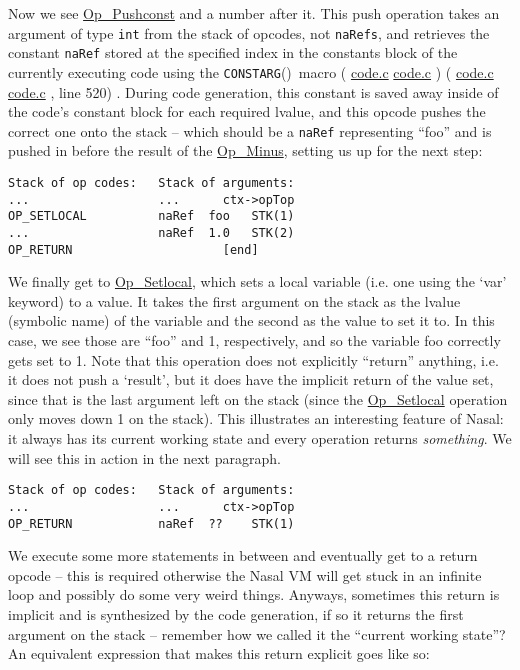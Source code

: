 \documentclass{article}
\newcommand{\type}[1]{\textcolor{type}{\tt #1}}
\newcommand{\localmacro}[1]{\textcolor{func}{\tt #1}}
\newcommand{\nasalsourcefile}[2][]{%
  \ifthenelse{\isempty{#1}}%
    {%
      \textcolor{source}{%
        \href{https://github.com/andyross/nasal/blob/master/src/#2}{#2}%
      }%
    }%
    {%
      \textcolor{source}{%
        \href{https://github.com/andyross/nasal/blob/master/src/#2\#L#1}{#2}%
      }%
    }%
}
\newcommand{\citesourcefile}[2][]{%
  \ifthenelse{\isempty{#1}}%
    {%
      (\nasalsourcefile{#2})%
    }%
    {%
      (\nasalsourcefile[#1]{#2}, line #1)%
    }%
}
\newcommand{\Op} [1]{\hyperref[op:#1]{\textcolor{opcode}{\sc Op\_#1}}}
\newcommand{\fp}{\textcolor{func}{()}}
\begin{document}
Now we see \Op{Pushconst} and a number after it.  This push operation takes an argument of type \type{int} from the stack of opcodes, not \type{naRefs}, and retrieves the constant \type{naRef} stored at the specified index in the constants block of the currently executing code using the \localmacro{CONSTARG}\fp\ macro \citesourcefile[520]{code.c}.  During code generation, this constant is saved away inside of the code's constant block for each required lvalue, and this opcode pushes the correct one onto the stack -- which should be a \type{naRef} representing ``foo'' and is pushed in before the result of the \Op{Minus}, setting us up for the next step:

\begin{verbatim}
Stack of op codes:   Stack of arguments:
...                  ...      ctx->opTop
OP_SETLOCAL          naRef  foo   STK(1)
...                  naRef  1.0   STK(2)
OP_RETURN                     [end]
\end{verbatim}

We finally get to \Op{Setlocal}, which sets a local variable (i.e. one using the `var' keyword) to a value.  It takes the first argument on the stack as the lvalue (symbolic name) of the variable and the second as the value to set it to.  In this case, we see those are ``foo'' and 1, respectively, and so the variable foo correctly gets set to 1.  Note that this operation does not explicitly ``return'' anything, i.e. it does not push a `result', but it does have the implicit return of the value set, since that is the last argument left on the stack (since the \Op{Setlocal} operation only moves down 1 on the stack).  This illustrates an interesting feature of Nasal: it always has its current working state and every operation returns \emph{something}.  We will see this in action in the next paragraph.

\begin{verbatim}
Stack of op codes:   Stack of arguments:
...                  ...      ctx->opTop
OP_RETURN            naRef  ??    STK(1)
\end{verbatim}

We execute some more statements in between and eventually get to a return opcode -- this is required otherwise the Nasal VM will get stuck in an infinite loop and possibly do some very weird things.  Anyways, sometimes this return is implicit and is synthesized by the code generation, if so it returns the first argument on the stack -- remember how we called it the ``current working state''? An equivalent expression that makes this return explicit goes like so:
\end{document}
